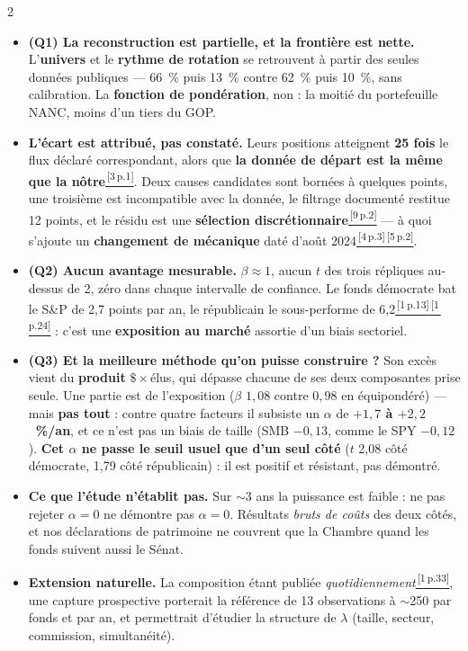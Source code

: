 \documentclass[9pt,a4paper]{extarticle}
\newenvironment{pts}{\begin{itemize}[leftmargin=3.4mm,itemsep=0.2mm,topsep=0.4mm,parsep=0pt,label={\color{bleu}\footnotesize\textbullet}]}{\end{itemize}}
\newcommand{\rf}[3]{\href{docs_nanc_gop/#2\#page=#3}{\color{bleu}\textsuperscript{\,[#1\,p.#3]}}}
\newcommand{\sPro}[1]{\rf{1}{1-prospectus-statutaire-SAI-20260127.pdf}{#1}}
\newcommand{\sChg}[1]{\rf{4}{4-changement-methode-20240802.pdf}{#1}}
\newcommand{\sAquatre}[1]{\rf{5}{5-rapport-annuel-FY2024.pdf}{#1}}
\newcommand{\sAcinq}[1]{\rf{9}{9-rapport-annuel-FY2025.pdf}{#1}}
\newcommand{\sVen}[1]{\rf{3}{3-podcast-Venuto-mecanique-20241206.pdf}{#1}}
\begin{document}
\begin{multicols}{2}
\begin{pts}
\item \textbf{(Q1) La reconstruction est partielle, et la frontière est nette.} L'\textbf{univers} et le \textbf{rythme de rotation} se retrouvent à partir des seules données publiques --- 66~\% puis 13~\% contre 62~\% puis 10~\%, sans calibration. La \textbf{fonction de pondération}, non : la moitié du portefeuille NANC, moins d'un tiers du GOP.
\item \textbf{L'écart est attribué, pas constaté.} Leurs positions atteignent \textbf{25 fois} le flux déclaré correspondant, alors que \textbf{la donnée de départ est la même que la nôtre}\sVen{1}. Deux causes candidates sont bornées à quelques points, une troisième est incompatible avec la donnée, le filtrage documenté restitue 12 points, et le résidu est une \textbf{sélection discrétionnaire}\sAcinq{2} --- à quoi s'ajoute un \textbf{changement de mécanique} daté d'août 2024\sChg{3}\sAquatre{2}.
\item \textbf{(Q2) Aucun avantage mesurable.} $\beta\approx1$, aucun $t$ des trois répliques au-dessus de 2, zéro dans chaque intervalle de confiance. Le fonds démocrate bat le S\&P de 2,7 points par an, le républicain le sous-performe de 6,2\sPro{13}\sPro{24} : c'est une \textbf{exposition au marché} assortie d'un biais sectoriel.
\item \textbf{(Q3) Et la meilleure méthode qu'on puisse construire ?} Son excès vient du \textbf{produit}
$\$\times$élus, qui dépasse chacune de ses deux composantes prise seule. Une partie est de l'exposition
($\beta$ $1{,}08$ contre $0{,}98$ en équipondéré) --- mais \textbf{pas tout} : contre quatre facteurs il subsiste
un $\alpha$ de \textbf{$+1{,}7$ à $+2{,}2$~\%/an}, et ce n'est pas un biais de taille (SMB $-0{,}13$, comme le
SPY $-0{,}12$). \textbf{Cet $\alpha$ ne passe le seuil usuel que d'un seul côté} ($t$ 2,08 côté démocrate,
1,79 côté républicain) : il est positif et résistant, pas démontré.
\item \textbf{Ce que l'étude n'établit pas.} Sur $\sim$3 ans la puissance est faible : ne pas rejeter $\alpha=0$ ne démontre pas $\alpha=0$. Résultats \emph{bruts de coûts} des deux côtés, et nos déclarations de patrimoine ne couvrent que la Chambre quand les fonds suivent aussi le Sénat.
\item \textbf{Extension naturelle.} La composition étant publiée \emph{quotidiennement}\sPro{33}, une capture prospective porterait la référence de 13 observations à $\sim$250 par fonds et par an, et permettrait d'étudier la structure de $\lambda$ (taille, secteur, commission, simultanéité).
\end{pts}

\end{multicols}
\end{document}

